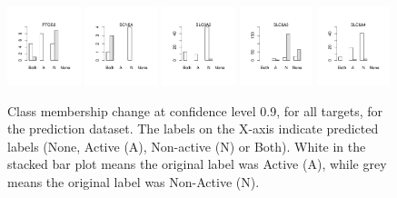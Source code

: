 \documentclass[utf8]{frontiersSCNS} %
\begin{document}
\begin{figure}[h!]
\includegraphics[width=0.19\textwidth]{figures/validation_plots/ptgs2_0p9_valplot.pdf}
\includegraphics[width=0.19\textwidth]{figures/validation_plots/scn5a_0p9_valplot.pdf}
\includegraphics[width=0.19\textwidth]{figures/validation_plots/slc6a2_0p9_valplot.pdf}
\includegraphics[width=0.19\textwidth]{figures/validation_plots/slc6a3_0p9_valplot.pdf}
\vspace*{-15pt} %
\includegraphics[width=0.19\textwidth]{figures/validation_plots/slc6a4_0p9_valplot.pdf}
    \caption{Class membership change at confidence level 0.9, for all targets,
    for the prediction dataset.
    The labels on the X-axis indicate predicted labels (None, Active (A),
    Non-active (N) or Both). White in the stacked bar plot means the
    original label was Active (A), while grey means the original label
    was Non-Active (N).
    }
    \label{fig:valplots_all_0.9}
\end{figure}
\end{document}
